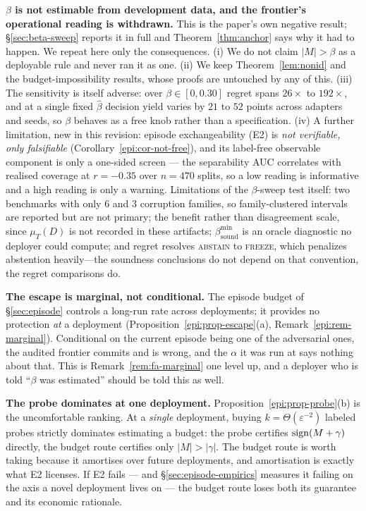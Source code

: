\textbf{$\beta$ is not estimable from development data, and the frontier's operational reading is
withdrawn.} This is the paper's own negative result; \S\ref{sec:beta-sweep} reports it in full and
Theorem~\ref{thm:anchor} says why it had to happen. We repeat here only the consequences.
(i) We do not claim $|M|>\beta$ as a deployable rule and never ran it as one. (ii) We keep
Theorem~\ref{lem:nonid} and the budget-impossibility results, whose proofs are untouched by any of
this. (iii) The sensitivity is itself adverse: over $\beta\in[0,0.30]$ regret spans $26\times$ to
$192\times$, and at a single fixed $\widehat\beta$ decision yield varies by $21$ to $52$ points
across adapters and seeds, so $\beta$ behaves as a free knob rather than a specification.
(iv) A further limitation, new in this revision: episode exchangeability (E2) is \emph{not
verifiable, only falsifiable} (Corollary~\ref{epi:cor-not-free}), and its label-free observable
component is only a one-sided screen --- the separability AUC correlates with realised coverage at
$r=-0.35$ over $n=470$ splits, so a low reading is informative and a high reading is only a warning.
Limitations of the $\beta$-sweep test itself: two benchmarks with only $6$ and
$3$ corruption families, so family-clustered intervals are reported but are not primary; the
benefit rather than disagreement scale, since $\mu_T(D)$ is not recorded in these artifacts;
$\beta^{\min}_{\mathrm{sound}}$ is an oracle diagnostic no deployer could compute; and regret
resolves \textsc{abstain} to \textsc{freeze}, which penalizes abstention heavily---the soundness
conclusions do not depend on that convention, the regret comparisons do.

\textbf{The escape is marginal, not conditional.} The episode budget of \S\ref{sec:episode}
controls a long-run rate across deployments; it provides no protection \emph{at} a deployment
(Proposition~\ref{epi:prop-escape}(a), Remark~\ref{epi:rem-marginal}). Conditional on the current
episode being one of the adversarial ones, the audited frontier commits and is wrong, and the
$\alpha$ it was run at says nothing about that. This is Remark~\ref{rem:fa-marginal} one level up,
and a deployer who is told ``$\beta$ was estimated'' should be told this as well.

\textbf{The probe dominates at one deployment.} Proposition~\ref{epi:prop-probe}(b) is the
uncomfortable ranking. At a \emph{single} deployment, buying $k=\Theta(\varepsilon^{-2})$ labeled
probes strictly dominates estimating a budget: the probe certifies $\operatorname{sign}(M+\gamma)$ directly, the
budget route certifies only $|M|>|\gamma|$. The budget route is worth taking because it amortises
over future deployments, and amortisation is exactly what E2 licenses. If E2 fails --- and
\S\ref{sec:episode-empirics} measures it failing on the axis a novel deployment lives on --- the
budget route loses both its guarantee and its economic rationale.

